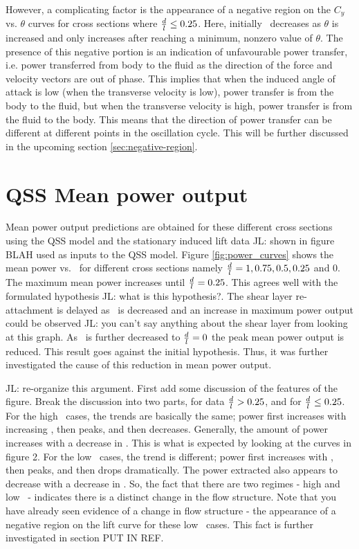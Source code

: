 However, a complicating factor is the appearance of a negative region on the $C_y$ vs. $\theta$ curves for cross sections where $\frac{d}{l}\leq0.25$. Here, initially \cy\ decreases as $\theta$ is increased and only increases after reaching a minimum, nonzero value of $\theta$. The presence of this negative portion is an indication of unfavourable power transfer, i.e. power transferred from body to the fluid as the direction of the force and velocity vectors are out of phase. This implies that when the induced angle of attack is low (when the transverse velocity is low), power transfer is from the body to the fluid, but when the transverse velocity is high, power transfer is from the fluid to the body. This means that the direction of power transfer can be different at different points in the oscillation cycle. This will be further discussed in the upcoming section \ref{sec:negative-region}.

 
 
 \section{QSS Mean power output}
 \label{sec:cross-sec-qss-mean power}
 
 
 
 Mean power output predictions are obtained for these different cross sections using the QSS model and the stationary induced lift data JL: shown in figure BLAH used as inputs to the QSS model. Figure \ref{fig:power_curves} shows the mean power vs. \massdamp\ for different cross sections namely $\frac{d}{l}=1,0.75,0.5,0.25$ and $0$. The maximum mean power increases until $\frac{d}{l}=0.25$. This agrees well with the formulated hypothesis JL: what is this hypothesis?. The shear layer re-attachment is delayed as \ratio\ is decreased and an increase in maximum power output could be observed JL: you can't say anything about the shear layer from looking at this graph. As \ratio\ is further decreased to $\frac{d}{l}=0$ the peak mean power output is reduced. This result goes against the initial hypothesis. Thus, it was further investigated the cause of this reduction in mean power output. 

JL: re-organize this argument. First add some discussion of the features of the figure. Break the discussion into two parts, for data $\frac{d}{l} > 0.25$, and for $\frac{d}{l} \leq 0.25$. For the high \ratio\ cases, the trends are basically the same; power first increases with increasing \massdamp, then peaks, and then decreases. Generally, the amount of power increases with a decrease in \ratio. This is what is expected by looking at the curves in figure 2. For the low \ratio\ cases, the trend is different; power first increases with \massdamp, then peaks, and then drops dramatically. The power extracted also appears to decrease with a decrease in \ratio. So, the fact that there are two regimes - high and low \ratio\ - indicates there is a distinct change in the flow structure. Note that you have already seen evidence of a change in flow structure - the appearance of a negative region on the lift curve for these low \ratio\ cases. This fact is further investigated in section PUT IN REF.
 
